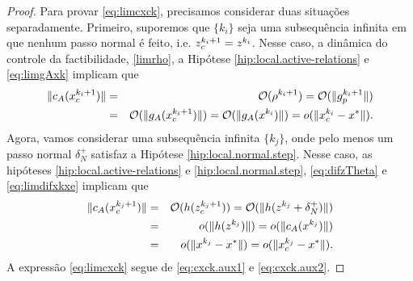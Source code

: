 \begin{proof}
Para provar \eqref{eq:limcxck}, precisamos considerar duas situações separadamente. Primeiro, 
suporemos que $\{k_i\}$ seja uma subsequência infinita em que nenhum passo normal é feito, i.e. 
$z_c^{k_i+1} = z^{k_i}$. 
Nesse caso, a dinâmica do controle da factibilidade, \eqref{limrho}, a Hipótese 
\ref{hip:local.active-relations} e \eqref{eq:limgAxk} implicam que
\begin{eqnarray}
 \norma{c_A(\xc{k_i+1})} & = & \bigo(\rho^{k_i+1}) = \bigo(\norma{\gpk{k_i+1}}) \nonumber \\
 & = & \bigo(\norma{g_A(\xc{k_i+1})}) = \bigo(\norma{g_A(x^{k_i})}) = o(\norma{\xc{k_i}-
x^*}). \visiblelbl{eq:cxck.aux1}
\end{eqnarray}
Agora, vamos considerar uma subsequência infinita $\{k_j\}$, onde pelo menos um
passo normal $\delta_N^+$ satisfaz a Hipótese \ref{hip:local.normal.step}.
Nesse caso, as hipóteses \ref{hip:local.active-relations} e
\ref{hip:local.normal.step}, \eqref{eq:difzTheta} e \eqref{eq:limdifxkxe}
implicam que
\begin{eqnarray}
 \norma{c_A(\xc{k_j + 1})} & = & \bigo(h(\zc{k_j+1})) = \bigo(\norma{h(z^{k_j} +
\delta_N^+)}) 
\nonumber \\
& = & o(\norma{h(z^{k_j})}) = o(\norma{c_A(x^{k_j})}) \nonumber \\
& = & o(\norma{x^{k_j} - x^*}) = o(\norma{\xc{k_j} - x^*}). \visiblelbl{eq:cxck.aux2}
\end{eqnarray}
A expressão \eqref{eq:limcxck} segue de \eqref{eq:cxck.aux1} e \eqref{eq:cxck.aux2}.


\end{proof}

